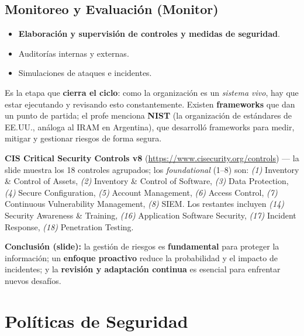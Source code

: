 \documentclass[11pt,a4paper]{article}
\begin{document}
\subsection{Monitoreo y Evaluación (Monitor)}

\begin{itemize}[leftmargin=1.4em,itemsep=1pt]
  \item \textbf{Elaboración y supervisión de controles y medidas de seguridad}.
  \item Auditorías internas y externas.
  \item Simulaciones de ataques e incidentes.
\end{itemize}

Es la etapa que \textbf{cierra el ciclo}: como la organización es un \emph{sistema vivo}, hay
que estar ejecutando y revisando esto constantemente. Existen \textbf{frameworks} que dan un
punto de partida; el profe menciona \textbf{NIST} (la organización de estándares de EE.UU.,
análoga al IRAM en Argentina), que desarrolló frameworks para medir, mitigar y gestionar
riesgos de forma segura.

\begin{slidebox}
\textbf{CIS Critical Security Controls v8} (\url{https://www.cisecurity.org/controls}) — la
slide muestra los 18 controles agrupados; los \emph{foundational} (1--8) son: \emph{(1)}
Inventory \& Control of Assets, \emph{(2)} Inventory \& Control of Software, \emph{(3)} Data
Protection, \emph{(4)} Secure Configuration, \emph{(5)} Account Management, \emph{(6)} Access
Control, \emph{(7)} Continuous Vulnerability Management, \emph{(8)} SIEM. Los restantes incluyen
\emph{(14)} Security Awareness \& Training, \emph{(16)} Application Software Security,
\emph{(17)} Incident Response, \emph{(18)} Penetration Testing.
\end{slidebox}

\begin{slidebox}
\textbf{Conclusión (slide):} la gestión de riesgos es \textbf{fundamental} para proteger la
información; un \textbf{enfoque proactivo} reduce la probabilidad y el impacto de incidentes; y
la \textbf{revisión y adaptación continua} es esencial para enfrentar nuevos desafíos.
\end{slidebox}

\section{Políticas de Seguridad}
\end{document}

